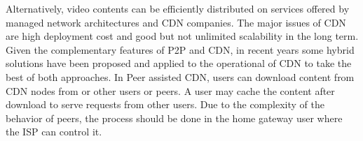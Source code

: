 Alternatively, video contents can be efficiently distributed on services offered by managed network architectures and CDN companies.
The major issues of CDN are high deployment cost and good but not unlimited scalability in the long term.  
Given the complementary features of P2P and CDN, in recent years some hybrid solutions have been proposed and applied to the operational of CDN \cite{Huang:2008:UHC:1496046.1496064,4772628,Yin:2009:DDH:1631272.1631279} to take the best of both approaches.
In Peer assisted CDN, users can download content from CDN nodes from or other users or peers. 
A user may cache the content after download to serve requests from other users. 
Due to the complexity of the behavior of peers, the process should be done in the home gateway user where the ISP can control it.

